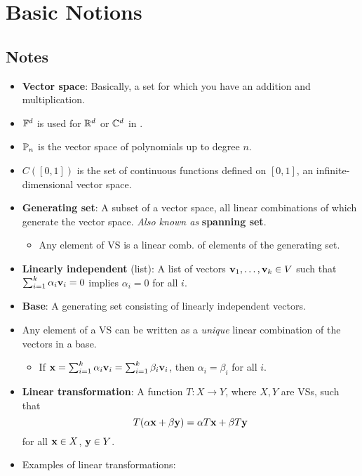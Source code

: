\documentclass[../../notes.tex]{subfiles}
\begin{document}
\chapter{Basic Notions}
\section{Notes}
\begin{itemize}
    \item {}\textbf{Vector space}: Basically, a set for which you have an addition and multiplication.
    \item $\mathbb{F}^d$ is used for $\mathbb{R}^d$ or $\mathbb{C}^d$ in \textcite{bib:Treil}.
    \item $\mathbb{P}_n$ is the vector space of polynomials up to degree $n$.
    \item $C([0,1])$ is the set of continuous functions defined on $[0,1]$, an infinite-dimensional vector space.
    \item \textbf{Generating set}: A subset of a vector space, all linear combinations of which generate the vector space. \emph{Also known as} \textbf{spanning set}.
    \begin{itemize}
        \item Any element of VS is a linear comb. of elements of the generating set.
    \end{itemize}
    \item \textbf{Linearly independent} (list): A list of vectors $\mathbf{v}_1,\dots,\mathbf{v}_k\in V$ such that $\sum_{i=1}^k\alpha_i\mathbf{v}_i=0$ implies $\alpha_i=0$ for all $i$.
    \item \textbf{Base}: A generating set consisting of linearly independent vectors.
    \item Any element of a VS can be written as a \emph{unique} linear combination of the vectors in a base.
    \begin{itemize}
        \item If $\mathbf{x}=\sum_{i=1}^k\alpha_i\mathbf{v}_i=\sum_{i=1}^k\beta_i\mathbf{v}_i$, then $\alpha_i=\beta_i$ for all $i$.
    \end{itemize}
    \item \textbf{Linear transformation}: A function $T:X\to Y$, where $X,Y$ are VSs, such that
    \begin{equation*}
        T(\alpha\mathbf{x}+\beta\mathbf{y}) = \alpha T\mathbf{x}+\beta T\mathbf{y}
    \end{equation*}
    for all $\mathbf{x}\in X$, $\mathbf{y}\in Y$.
    \item Examples of linear transformations:
    \begin{itemize}

\end{itemize}
\end{itemize}
\end{document}
